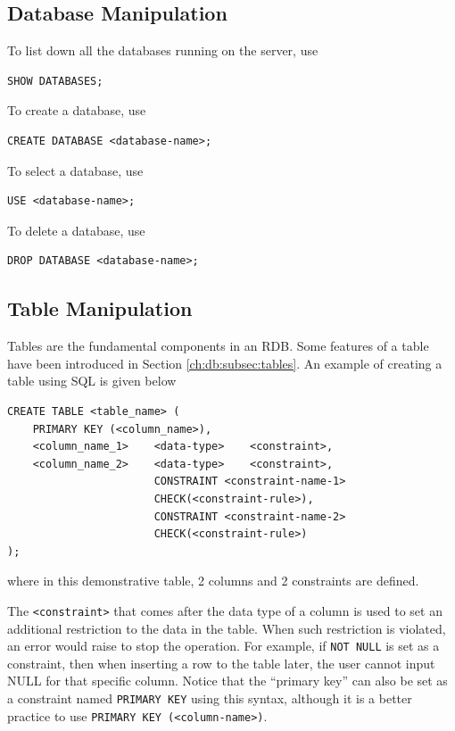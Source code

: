 \subsection{Database Manipulation}

To list down all the databases running on the server, use
\begin{lstlisting}
SHOW DATABASES;
\end{lstlisting}
To create a database, use
\begin{lstlisting}
CREATE DATABASE <database-name>;
\end{lstlisting}
To select a database, use
\begin{lstlisting}
USE <database-name>;
\end{lstlisting}
To delete a database, use
\begin{lstlisting}
DROP DATABASE <database-name>;
\end{lstlisting}

\subsection{Table Manipulation}

Tables are the fundamental components in an RDB. Some features of a table have been introduced in Section \ref{ch:db:subsec:tables}. An example of creating a table using SQL is given below
\begin{lstlisting}
CREATE TABLE <table_name> (
    PRIMARY KEY (<column_name>),
    <column_name_1>    <data-type>    <constraint>,
    <column_name_2>    <data-type>    <constraint>,
                       CONSTRAINT <constraint-name-1>
                       CHECK(<constraint-rule>),
                       CONSTRAINT <constraint-name-2>
                       CHECK(<constraint-rule>)
);
\end{lstlisting}
where in this demonstrative table, 2 columns and 2 constraints are defined.

The \verb|<constraint>| that comes after the data type of a column is used to set an additional restriction to the data in the table. When such restriction is violated, an error would raise to stop the operation. For example, if \verb|NOT NULL| is set as a constraint, then when inserting a row to the table later, the user cannot input NULL for that specific column. Notice that the ``primary key'' can also be set as a constraint named \verb|PRIMARY KEY| using this syntax, although it is a better practice to use \verb|PRIMARY KEY (<column-name>)|.

